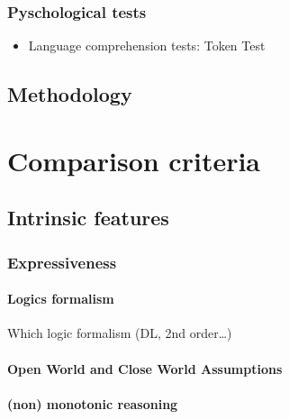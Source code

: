 \documentclass[a4paper]{article}
\begin{document}
\subsubsection{Pyschological tests}
\label{sect|evaluation-tests}

\begin{itemize}
	\item Language comprehension tests: Token Test~\cite{DiSimoni1978}
\end{itemize}

\subsection{Methodology}
\label{sect|methodology}



\section{Comparison criteria}
\label{sect|comparison-criteria}

\subsection{Intrinsic features}
\label{sect|intrinsic-features}

\subsubsection{Expressiveness}
\label{sect|expressiveness}

\paragraph{Logics formalism}

Which logic formalism (DL, 2nd order\ldots{})

\paragraph{Open World and Close World Assumptions}


\paragraph{(non) monotonic reasoning}
\end{document}
